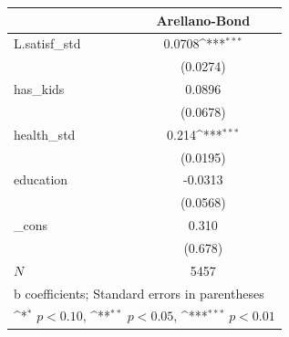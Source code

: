 {
\def\sym#1{\ifmmode^{#1}\else\(^{#1}\)\fi}
\begin{tabular}{l*{1}{c}}
\hline\hline
            &\multicolumn{1}{c}{Arellano-Bond}\\
\hline
L.satisf\_std&      0.0708\sym{***}\\
            &    (0.0274)         \\
[1em]
has\_kids    &      0.0896         \\
            &    (0.0678)         \\
[1em]
health\_std  &       0.214\sym{***}\\
            &    (0.0195)         \\
[1em]
education   &     -0.0313         \\
            &    (0.0568)         \\
[1em]
\_cons      &       0.310         \\
            &     (0.678)         \\
\hline
\(N\)       &        5457         \\
\hline\hline
\multicolumn{2}{l}{\footnotesize b coefficients; Standard errors in parentheses}\\
\multicolumn{2}{l}{\footnotesize \sym{*} \(p<0.10\), \sym{**} \(p<0.05\), \sym{***} \(p<0.01\)}\\
\end{tabular}
}
